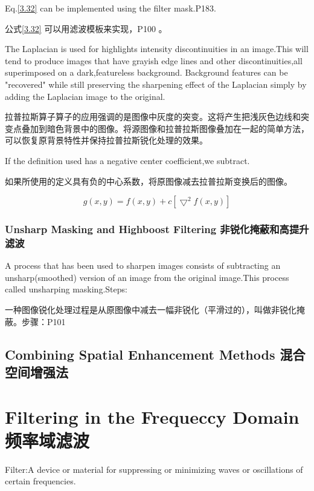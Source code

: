 \documentclass[12pt]{article}
\numberwithin{equation}{section}%
\begin{document}
Eq.\ref{3.32} can be implemented using the filter mask.P183.

公式\ref{3.32} 可以用滤波模板来实现，P100 。

The Laplacian is used for highlights intensity discontinuities in an image.This will tend to produce images that have grayish edge lines and other discontinuities,all superimposed on a dark,featureless background.
Background features can be "recovered" while still preserving the sharpening effect of the Laplacian simply by adding the Laplacian image to the original.

拉普拉斯算子算子的应用强调的是图像中灰度的突变。这将产生把浅灰色边线和突变点叠加到暗色背景中的图像。将源图像和拉普拉斯图像叠加在一起的简单方法，可以恢复原背景特性并保持拉普拉斯锐化处理的效果。

If the definition used has a negative center coefficient,we subtract.

如果所使用的定义具有负的中心系数，将原图像减去拉普拉斯变换后的图像。

\begin{equation} \label{3.33}
g(x,y)=f(x,y)+c[\bigtriangledown^{2}f(x,y)]
\end{equation}

\subsubsection{Unsharp Masking and Highboost Filtering 非锐化掩蔽和高提升滤波}

A process that has been used to sharpen images consists of subtracting an unsharp(smoothed) version of an image from the original image.This process called unsharping masking.Steps:

一种图像锐化处理过程是从原图像中减去一幅非锐化（平滑过的），叫做非锐化掩蔽。步骤：P101

\subsection{Combining Spatial Enhancement Methods 混合空间增强法}

\section{Filtering in the Frequeccy Domain 频率域滤波}

Filter:A device or material for suppressing or minimizing waves or oscillations of certain frequencies.
\end{document}
